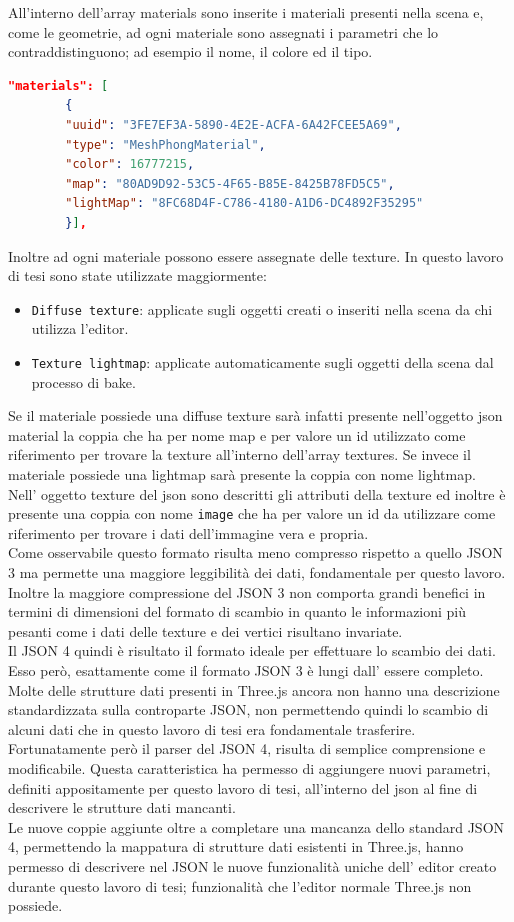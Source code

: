 All’interno dell’array materials sono inserite i materiali presenti nella scena e, come le geometrie, ad ogni materiale sono assegnati i parametri che lo contraddistinguono; ad esempio il nome, il colore ed il tipo.
\begin{lstlisting}[language=json]
"materials": [
        {
        "uuid": "3FE7EF3A-5890-4E2E-ACFA-6A42FCEE5A69",
        "type": "MeshPhongMaterial",
        "color": 16777215,
        "map": "80AD9D92-53C5-4F65-B85E-8425B78FD5C5",
        "lightMap": "8FC68D4F-C786-4180-A1D6-DC4892F35295"
        }],
\end{lstlisting}
Inoltre ad ogni materiale possono essere assegnate delle texture. In questo lavoro di tesi sono state utilizzate maggiormente:
\begin{itemize}
\item \texttt{Diffuse texture}: applicate sugli oggetti creati o inseriti nella scena da chi utilizza l’editor.
\item \texttt{Texture lightmap}: applicate automaticamente sugli oggetti della scena dal processo di bake.
\end{itemize}
Se il materiale possiede una diffuse texture sarà infatti presente nell’oggetto json material la coppia che ha per nome map e per valore un id utilizzato come riferimento per trovare la texture all’interno dell’array textures. 
Se invece il materiale possiede una lightmap sarà presente la coppia con nome lightmap.
\\
Nell’ oggetto texture del json sono descritti gli attributi della texture ed inoltre è presente una coppia con nome \texttt{image} che ha per valore un id da utilizzare come riferimento per trovare i dati dell’immagine vera e propria.
\\
Come osservabile questo formato risulta meno compresso rispetto a quello JSON 3 ma permette una maggiore leggibilità dei dati, fondamentale per questo lavoro. 
\\
Inoltre la maggiore compressione del JSON 3 non comporta grandi benefici in termini di dimensioni del formato di scambio in quanto le informazioni più pesanti come i dati delle texture e dei vertici risultano invariate.
\\
Il JSON 4 quindi è risultato il formato ideale per effettuare lo scambio dei dati. Esso però, esattamente come il formato JSON 3 è lungi dall’ essere completo. 
Molte delle strutture dati presenti in Three.js ancora non hanno una descrizione standardizzata sulla controparte JSON, non permettendo quindi lo scambio di alcuni dati che in questo lavoro di tesi era fondamentale trasferire.
\\
Fortunatamente però il parser del JSON 4, risulta di semplice comprensione e modificabile. Questa caratteristica ha permesso di aggiungere nuovi parametri, definiti appositamente per questo lavoro di tesi, all’interno del json al fine di descrivere le strutture dati mancanti.
\\
Le nuove coppie aggiunte oltre a completare una mancanza dello standard JSON 4, permettendo la mappatura di strutture dati esistenti in Three.js, hanno permesso di descrivere nel JSON le nuove funzionalità uniche dell’ editor creato durante questo lavoro di tesi; funzionalità che l’editor normale Three.js non possiede.



